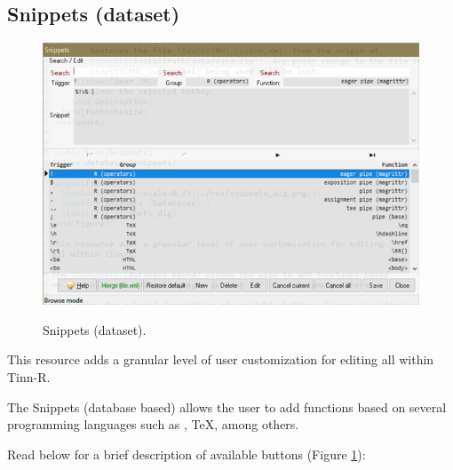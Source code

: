 \subsection{Snippets (dataset)}

\begin{figure}[H]
  \includegraphics[scale=0.8]{./res/dlg_snippets.png}\\
  \caption{Snippets (dataset).}
  \label{fig:dlg_snippets}
\end{figure}

This resource adds a granular level of user customization for editing
all within Tinn-R.

The Snippets (database based) allows the user to add functions based
on several programming languages such as \RR{}, \TeX, among others.

Read below for a brief description of available buttons (Figure \ref{fig:dlg_snippets}):

